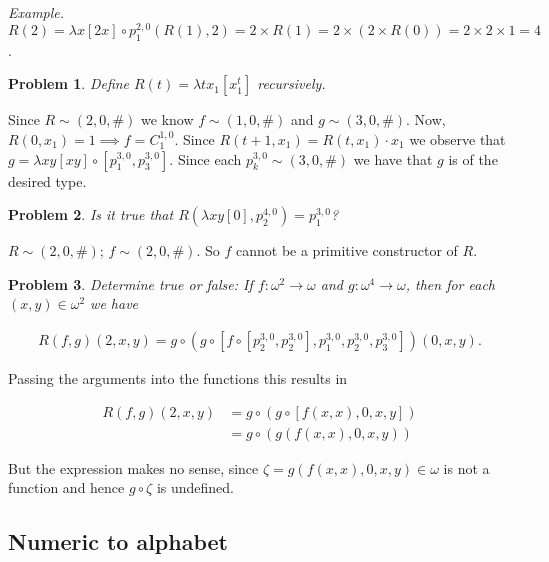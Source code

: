 \documentclass[a4paper, 12pt]{article}
\newtheorem{problem}{Problem}
\newtheorem{problem}{Problem}
\begin{document}
\textit{Example.} $R(2) = \lambda x[2x] \circ p_1^{2, 0} \left( R(1), 2 \right)
= 2 \times R(1) = 2 \times \left( 2 \times R(0) \right) = 2 \times 2 \times 1 =
4$.

\begin{problem}
    Define $R(t) = \lambda tx_1\left[ x_1^t \right] $ recursively.
\end{problem}

Since $R \sim (2, 0, \#)$ we know $f \sim (1, 0, \#)$ and $g \sim (3, 0, \#)$.
Now, $R(0, x_1) = 1 \implies f = C_{1}^{1, 0}$. Since $R(t + 1, x_1) = R(t, x_1)
\cdot x_1$  we observe that $g = \lambda xy[xy] \circ \left[ p_1^{3, 0},
p_{3}^{3, 0} \right] $. Since each $p_{k}^{3, 0} \sim (3, 0, \#)$ we have that
$g$ is of the desired type.

\begin{problem}
    Is it true that $R(\lambda xy[0], p_2^{4, 0}) = p_1^{3, 0}$?
\end{problem}

$R \sim (2, 0, \#)$; $f \sim (2, 0, \#)$. So $f$ cannot be a primitive
constructor of $R$.

\begin{problem}
    Determine true or false: If $f : \omega^2 \to \omega$ and $g : \omega^4 \to
    \omega$, then for each $(x, y) \in \omega^2$ we have

    \begin{align*}
        R(f, g)(2, x, y) = g \circ \left( g \circ \left[ f \circ \left[ p_2^{3,
        0}, p_2^{3, 0} \right], p_1^{3, 0}, p_2^{3, 0}, p_3^{3, 0}  \right]
    \right) (0, x, y).
    \end{align*}
\end{problem}

Passing the arguments into the functions this results in 

\begin{align*}
    R(f, g)(2, x, y) &= g \circ \left( g \circ \left[ f(x, x) , 0, x, y
    \right]\right)  \\ 
                     &= g \circ \left( g \left( f(x, x), 0, x, y \right)
                     \right)
\end{align*}

But the expression makes no sense, since $\zeta = g(f(x, x), 0, x, y) \in
\omega$ is not a function and hence $g \circ \zeta$ is undefined.

\subsection{Numeric to alphabet}
\end{document}
